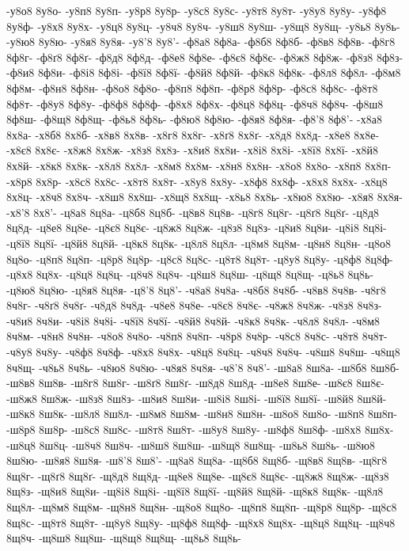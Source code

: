 {-у8о8
8у8о-
-у8п8
8у8п-
-у8р8
8у8р-
-у8с8
8у8с-
-у8т8
8у8т-
-у8у8
8у8у-
-у8ф8
8у8ф-
-у8х8
8у8х-
-у8ц8
8у8ц-
-у8ч8
8у8ч-
-у8ш8
8у8ш-
-у8щ8
8у8щ-
-у8ь8
8у8ь-
-у8ю8
8у8ю-
-у8я8
8у8я-
-у8'8
8у8'-
-ф8а8
8ф8а-
-ф8б8
8ф8б-
-ф8в8
8ф8в-
-ф8г8
8ф8г-
-ф8ґ8
8ф8ґ-
-ф8д8
8ф8д-
-ф8е8
8ф8е-
-ф8є8
8ф8є-
-ф8ж8
8ф8ж-
-ф8з8
8ф8з-
-ф8и8
8ф8и-
-ф8і8
8ф8і-
-ф8ї8
8ф8ї-
-ф8й8
8ф8й-
-ф8к8
8ф8к-
-ф8л8
8ф8л-
-ф8м8
8ф8м-
-ф8н8
8ф8н-
-ф8о8
8ф8о-
-ф8п8
8ф8п-
-ф8р8
8ф8р-
-ф8с8
8ф8с-
-ф8т8
8ф8т-
-ф8у8
8ф8у-
-ф8ф8
8ф8ф-
-ф8х8
8ф8х-
-ф8ц8
8ф8ц-
-ф8ч8
8ф8ч-
-ф8ш8
8ф8ш-
-ф8щ8
8ф8щ-
-ф8ь8
8ф8ь-
-ф8ю8
8ф8ю-
-ф8я8
8ф8я-
-ф8'8
8ф8'-
-х8а8
8х8а-
-х8б8
8х8б-
-х8в8
8х8в-
-х8г8
8х8г-
-х8ґ8
8х8ґ-
-х8д8
8х8д-
-х8е8
8х8е-
-х8є8
8х8є-
-х8ж8
8х8ж-
-х8з8
8х8з-
-х8и8
8х8и-
-х8і8
8х8і-
-х8ї8
8х8ї-
-х8й8
8х8й-
-х8к8
8х8к-
-х8л8
8х8л-
-х8м8
8х8м-
-х8н8
8х8н-
-х8о8
8х8о-
-х8п8
8х8п-
-х8р8
8х8р-
-х8с8
8х8с-
-х8т8
8х8т-
-х8у8
8х8у-
-х8ф8
8х8ф-
-х8х8
8х8х-
-х8ц8
8х8ц-
-х8ч8
8х8ч-
-х8ш8
8х8ш-
-х8щ8
8х8щ-
-х8ь8
8х8ь-
-х8ю8
8х8ю-
-х8я8
8х8я-
-х8'8
8х8'-
-ц8а8
8ц8а-
-ц8б8
8ц8б-
-ц8в8
8ц8в-
-ц8г8
8ц8г-
-ц8ґ8
8ц8ґ-
-ц8д8
8ц8д-
-ц8е8
8ц8е-
-ц8є8
8ц8є-
-ц8ж8
8ц8ж-
-ц8з8
8ц8з-
-ц8и8
8ц8и-
-ц8і8
8ц8і-
-ц8ї8
8ц8ї-
-ц8й8
8ц8й-
-ц8к8
8ц8к-
-ц8л8
8ц8л-
-ц8м8
8ц8м-
-ц8н8
8ц8н-
-ц8о8
8ц8о-
-ц8п8
8ц8п-
-ц8р8
8ц8р-
-ц8с8
8ц8с-
-ц8т8
8ц8т-
-ц8у8
8ц8у-
-ц8ф8
8ц8ф-
-ц8х8
8ц8х-
-ц8ц8
8ц8ц-
-ц8ч8
8ц8ч-
-ц8ш8
8ц8ш-
-ц8щ8
8ц8щ-
-ц8ь8
8ц8ь-
-ц8ю8
8ц8ю-
-ц8я8
8ц8я-
-ц8'8
8ц8'-
-ч8а8
8ч8а-
-ч8б8
8ч8б-
-ч8в8
8ч8в-
-ч8г8
8ч8г-
-ч8ґ8
8ч8ґ-
-ч8д8
8ч8д-
-ч8е8
8ч8е-
-ч8є8
8ч8є-
-ч8ж8
8ч8ж-
-ч8з8
8ч8з-
-ч8и8
8ч8и-
-ч8і8
8ч8і-
-ч8ї8
8ч8ї-
-ч8й8
8ч8й-
-ч8к8
8ч8к-
-ч8л8
8ч8л-
-ч8м8
8ч8м-
-ч8н8
8ч8н-
-ч8о8
8ч8о-
-ч8п8
8ч8п-
-ч8р8
8ч8р-
-ч8с8
8ч8с-
-ч8т8
8ч8т-
-ч8у8
8ч8у-
-ч8ф8
8ч8ф-
-ч8х8
8ч8х-
-ч8ц8
8ч8ц-
-ч8ч8
8ч8ч-
-ч8ш8
8ч8ш-
-ч8щ8
8ч8щ-
-ч8ь8
8ч8ь-
-ч8ю8
8ч8ю-
-ч8я8
8ч8я-
-ч8'8
8ч8'-
-ш8а8
8ш8а-
-ш8б8
8ш8б-
-ш8в8
8ш8в-
-ш8г8
8ш8г-
-ш8ґ8
8ш8ґ-
-ш8д8
8ш8д-
-ш8е8
8ш8е-
-ш8є8
8ш8є-
-ш8ж8
8ш8ж-
-ш8з8
8ш8з-
-ш8и8
8ш8и-
-ш8і8
8ш8і-
-ш8ї8
8ш8ї-
-ш8й8
8ш8й-
-ш8к8
8ш8к-
-ш8л8
8ш8л-
-ш8м8
8ш8м-
-ш8н8
8ш8н-
-ш8о8
8ш8о-
-ш8п8
8ш8п-
-ш8р8
8ш8р-
-ш8с8
8ш8с-
-ш8т8
8ш8т-
-ш8у8
8ш8у-
-ш8ф8
8ш8ф-
-ш8х8
8ш8х-
-ш8ц8
8ш8ц-
-ш8ч8
8ш8ч-
-ш8ш8
8ш8ш-
-ш8щ8
8ш8щ-
-ш8ь8
8ш8ь-
-ш8ю8
8ш8ю-
-ш8я8
8ш8я-
-ш8'8
8ш8'-
-щ8а8
8щ8а-
-щ8б8
8щ8б-
-щ8в8
8щ8в-
-щ8г8
8щ8г-
-щ8ґ8
8щ8ґ-
-щ8д8
8щ8д-
-щ8е8
8щ8е-
-щ8є8
8щ8є-
-щ8ж8
8щ8ж-
-щ8з8
8щ8з-
-щ8и8
8щ8и-
-щ8і8
8щ8і-
-щ8ї8
8щ8ї-
-щ8й8
8щ8й-
-щ8к8
8щ8к-
-щ8л8
8щ8л-
-щ8м8
8щ8м-
-щ8н8
8щ8н-
-щ8о8
8щ8о-
-щ8п8
8щ8п-
-щ8р8
8щ8р-
-щ8с8
8щ8с-
-щ8т8
8щ8т-
-щ8у8
8щ8у-
-щ8ф8
8щ8ф-
-щ8х8
8щ8х-
-щ8ц8
8щ8ц-
-щ8ч8
8щ8ч-
-щ8ш8
8щ8ш-
-щ8щ8
8щ8щ-
-щ8ь8
8щ8ь-
}
